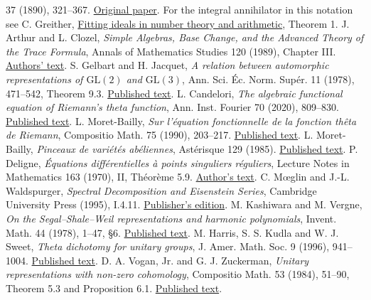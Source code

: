 37 (1890), 321--367. \href{https://doi.org/10.1007/BF01721360}{Original paper}.
For the integral annihilator in this notation see C. Greither,
\href{https://doi.org/10.1365/s13291-021-00233-5}{Fitting ideals in number theory and arithmetic}, Theorem 1.
 J. Arthur and L. Clozel, \emph{Simple Algebras,
Base Change, and the Advanced Theory of the Trace Formula}, Annals of
Mathematics Studies 120 (1989), Chapter III.
\href{https://www.math.toronto.edu/arthur/pdf/30.pdf}{Authors' text}.
 S. Gelbart and H. Jacquet,
\emph{A relation between automorphic representations of \(\mathrm{GL}(2)\)
and \(\mathrm{GL}(3)\)}, Ann. Sci. \'{E}c. Norm. Sup\'er. 11 (1978),
471--542, Theorem 9.3.
\href{https://www.numdam.org/article/ASENS_1978_4_11_4_471_0.pdf}{Published text}.
 L. Candelori, \emph{The algebraic functional equation of
Riemann's theta function}, Ann. Inst. Fourier 70 (2020), 809--830.
\href{https://doi.org/10.5802/aif.3324}{Published text}.
 L. Moret-Bailly, \emph{Sur l'équation fonctionnelle
de la fonction thêta de Riemann}, Compositio Math. 75 (1990), 203--217.
\href{https://www.numdam.org/item/CM_1990__75_2_203_0/}{Published text}.
 L. Moret-Bailly,
\emph{Pinceaux de variétés abéliennes}, Astérisque 129 (1985).
\href{https://www.numdam.org/item/AST_1985__129__1_0/}{Published text}.
 P. Deligne, \emph{Équations différentielles à
points singuliers réguliers}, Lecture Notes in Mathematics 163 (1970),
II, Théorème 5.9. \href{https://publications.ias.edu/node/355}{Author's text}.
 C. M{\oe}glin and J.-L. Waldspurger,
\emph{Spectral Decomposition and Eisenstein Series}, Cambridge University
Press (1995), I.4.11.
\href{https://doi.org/10.1017/CBO9780511470905}{Publisher's edition}.
 M. Kashiwara and M. Vergne,
\emph{On the Segal--Shale--Weil representations and harmonic polynomials},
Invent. Math. 44 (1978), 1--47, \S6.
\href{https://doi.org/10.1007/BF01389900}{Published text}.
 M. Harris, S. S. Kudla and W. J. Sweet,
\emph{Theta dichotomy for unitary groups}, J. Amer. Math. Soc. 9
(1996), 941--1004. \href{https://doi.org/10.1090/S0894-0347-96-00198-1}{Published text}.
 D. A. Vogan, Jr. and G. J. Zuckerman,
\emph{Unitary representations with non-zero cohomology}, Compositio
Math. 53 (1984), 51--90, Theorem 5.3 and Proposition 6.1.
\href{https://www.numdam.org/item/CM_1984__53_1_51_0/}{Published text}.
